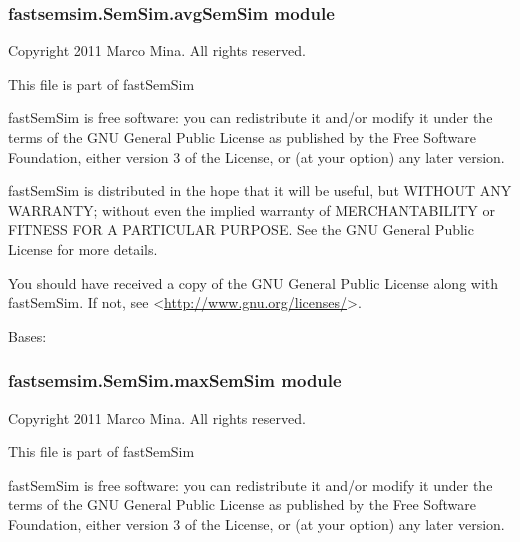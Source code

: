 \documentclass[letterpaper,10pt,english]{sphinxmanual}
\begin{document}
\subsubsection{fastsemsim.SemSim.avgSemSim module}
\label{fastsemsim.SemSim:fastsemsim-semsim-avgsemsim-module}\label{fastsemsim.SemSim:module-fastsemsim.SemSim.avgSemSim}
Copyright 2011 Marco Mina. All rights reserved.

This file is part of fastSemSim

fastSemSim is free software: you can redistribute it and/or modify
it under the terms of the GNU General Public License as published by
the Free Software Foundation, either version 3 of the License, or
(at your option) any later version.

fastSemSim is distributed in the hope that it will be useful,
but WITHOUT ANY WARRANTY; without even the implied warranty of
MERCHANTABILITY or FITNESS FOR A PARTICULAR PURPOSE.  See the
GNU General Public License for more details.

You should have received a copy of the GNU General Public License
along with fastSemSim.  If not, see \textless{}\href{http://www.gnu.org/licenses/}{http://www.gnu.org/licenses/}\textgreater{}.

\begin{fulllineitems}
\label{fastsemsim.SemSim:fastsemsim.SemSim.avgSemSim.avgSemSim}
Bases: {\hyperref[fastsemsim.SemSim:fastsemsim.SemSim.MixSemSim.MixSemSim]{}}

\end{fulllineitems}



\subsubsection{fastsemsim.SemSim.maxSemSim module}
\label{fastsemsim.SemSim:module-fastsemsim.SemSim.maxSemSim}\label{fastsemsim.SemSim:fastsemsim-semsim-maxsemsim-module}
Copyright 2011 Marco Mina. All rights reserved.

This file is part of fastSemSim

fastSemSim is free software: you can redistribute it and/or modify
it under the terms of the GNU General Public License as published by
the Free Software Foundation, either version 3 of the License, or
(at your option) any later version.
\end{document}
